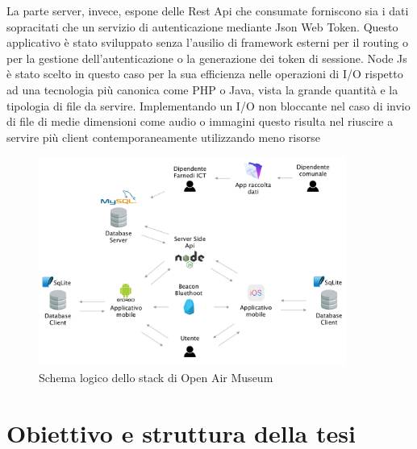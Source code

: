 \vspace{5mm}La parte server, invece, espone delle Rest Api che consumate forniscono sia i dati sopracitati che un servizio di autenticazione mediante Json Web Token. Questo applicativo è stato sviluppato senza l’ausilio di framework esterni per il routing o per la gestione dell’autenticazione o la generazione dei token di sessione. Node Js è stato scelto in questo caso per la sua efficienza nelle operazioni di I/O rispetto ad una tecnologia più canonica come PHP o Java, vista la grande quantità e la tipologia di file da servire. Implementando un I/O non bloccante nel caso di invio di file di medie dimensioni come audio o immagini questo risulta nel riuscire a servire più client contemporaneamente utilizzando meno risorse \cite{BlockingVsNonBlocking} \vspace{5mm}

\begin{figure}[h]
\centering
\includegraphics[width=0.9\textwidth]{images/SchemaOpenAirMuseum.png}
\caption{Schema logico dello stack di Open Air Museum}
\end{figure}

\section{Obiettivo e struttura della tesi}\vspace{5mm}

